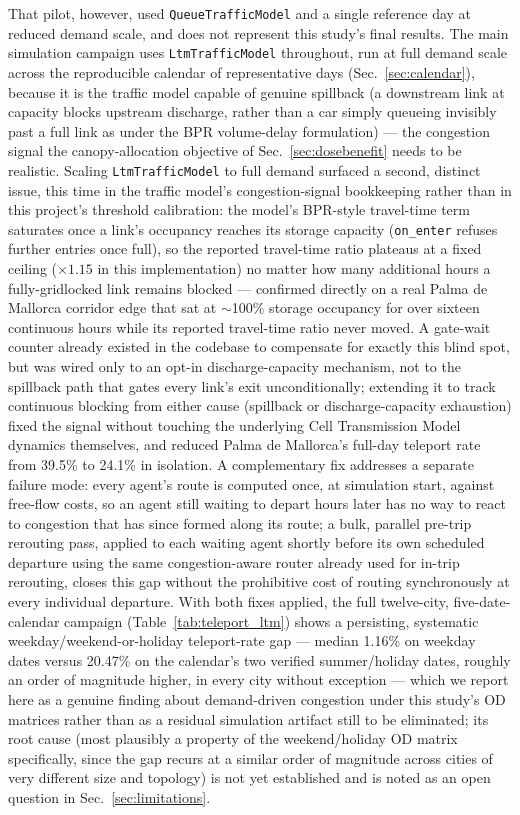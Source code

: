 \documentclass[pdflatex,sn-mathphys-ay]{sn-jnl}
\begin{document}
That pilot, however, used \texttt{QueueTrafficModel} and a single reference
day at reduced demand scale, and does not represent this study's final
results. The main simulation campaign uses \texttt{LtmTrafficModel}
throughout, run at full demand scale across the reproducible calendar of
representative days (Sec.~\ref{sec:calendar}), because it is the traffic
model capable of genuine spillback (a downstream link at capacity blocks
upstream discharge, rather than a car simply queueing invisibly past a full
link as under the BPR volume-delay formulation) --- the congestion signal the
canopy-allocation objective of Sec.~\ref{sec:dosebenefit} needs to be
realistic. Scaling \texttt{LtmTrafficModel} to full demand surfaced a second,
distinct issue, this time in the traffic model's congestion-signal
bookkeeping rather than in this project's threshold calibration: the model's
BPR-style travel-time term saturates once a link's occupancy reaches its
storage capacity (\texttt{on\_enter} refuses further entries once full), so
the reported travel-time ratio plateaus at a fixed ceiling ($\times 1.15$
in this implementation) no matter how many additional hours a fully-gridlocked
link remains blocked --- confirmed directly on a real Palma de Mallorca
corridor edge that sat at $\sim$100\% storage occupancy for over sixteen
continuous hours while its reported travel-time ratio never moved. A
gate-wait counter already existed in the codebase to compensate for exactly
this blind spot, but was wired only to an opt-in discharge-capacity
mechanism, not to the spillback path that gates every link's exit
unconditionally; extending it to track continuous blocking from either cause
(spillback or discharge-capacity exhaustion) fixed the signal without
touching the underlying Cell Transmission Model dynamics themselves, and
reduced Palma de Mallorca's full-day teleport rate from 39.5\% to 24.1\% in
isolation. A complementary fix addresses a separate failure mode: every
agent's route is computed once, at simulation start, against free-flow
costs, so an agent still waiting to depart hours later has no way to react
to congestion that has since formed along its route; a bulk, parallel
pre-trip rerouting pass, applied to each waiting agent shortly before its own
scheduled departure using the same congestion-aware router already used for
in-trip rerouting, closes this gap without the prohibitive cost of routing
synchronously at every individual departure. With both fixes applied, the
full twelve-city, five-date-calendar campaign (Table~\ref{tab:teleport_ltm})
shows a persisting, systematic weekday/weekend-or-holiday teleport-rate gap
--- median 1.16\% on weekday dates versus 20.47\% on the calendar's two
verified summer/holiday dates, roughly an order of magnitude higher, in
every city without exception --- which we report here as a genuine finding
about demand-driven congestion under this study's OD matrices rather than as
a residual simulation artifact still to be eliminated; its root cause (most
plausibly a property of the weekend/holiday OD matrix specifically, since the
gap recurs at a similar order of magnitude across cities of very different
size and topology) is not yet established and is noted as an open question
in Sec.~\ref{sec:limitations}.
\end{document}
